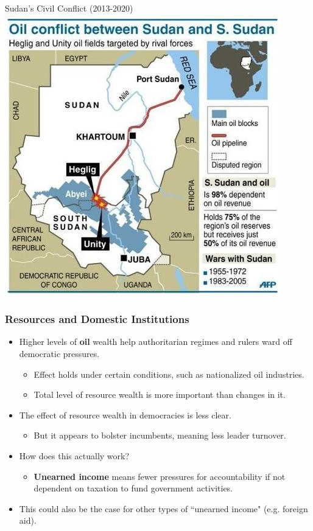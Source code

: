 \documentclass[handout]{beamer}
\begin{document}
\begin{frame}{\LARGE Sudan's Civil Conflict (2013-2020)}
	\centering
	\includegraphics[width=\textwidth,height=0.8\textheight,keepaspectratio]{sudan oil fields.jpg}
\end{frame}




\begin{frame} 
	\frametitle{\LARGE{Resources and Domestic Institutions}}
	\begin{itemize}
		
		\item Higher levels of \textbf{oil} wealth help authoritarian regimes and rulers ward off democratic pressures. \pause
		\begin{itemize}
			\item Effect holds under certain conditions, such as nationalized oil industries. \pause
			\item Total level of resource wealth is more important than changes in it. \pause
		\end{itemize}
		\item The effect of resource wealth in democracies is less clear. \pause
		\begin{itemize}
			\item But it appears to bolster incumbents, meaning less leader turnover. \pause
		\end{itemize}
		\item How does this actually work? \pause
		\begin{itemize}
			\item \textbf{Unearned income} means fewer pressures for accountability if not dependent on taxation to fund government activities. \pause
		\end{itemize}
		\item This could also be the case for other types of ``unearned income" (e.g. foreign aid).
		
	\end{itemize}
\end{frame}
\end{document}

